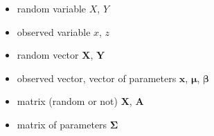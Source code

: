\documentclass[
]{article}
\begin{document}
\newcommand{\malpha}{\mathbf{\alpha}}
\newcommand{\mbeta}{\mathbf{\beta}}
\newcommand{\mgamma}{\mathbf{\gamma}}
\newcommand{\mdelta}{\mathbf{\delta}}
\newcommand{\mepsilon}{\mathbf{\epsilon}}
\newcommand{\mvarepsilon}{\mathbf{\varepsilon}}
\newcommand{\mzeta}{\mathbf{\zeta}}
\newcommand{\meta}{\mathbf{\eta}}
\newcommand{\mtheta}{\mathbf{\theta}}
\newcommand{\miota}{\mathbf{\iota}}
\newcommand{\mkappa}{\mathbf{\kappa}}
\newcommand{\mlambda}{\mathbf{\lambda}}
\newcommand{\mmu}{\mathbf{\mu}}
\newcommand{\mnu}{\mathbf{\nu}}
\newcommand{\mxi}{\mathbf{\xi}}
\newcommand{\mpi}{\mathbf{\pi}}
\newcommand{\mrho}{\mathbf{\rho}}
\newcommand{\msigma}{\mathbf{\sigma}}
\newcommand{\mtau}{\mathbf{\tau}}
\newcommand{\mchi}{\mathbf{\chi}}
\newcommand{\mpsi}{\mathbf{\psi}}
\newcommand{\momega}{\mathbf{\omega}}
\newcommand{\mGamma}{\mathbf{\Gamma}}
\newcommand{\mDelta}{\mathbf{\Delta}}
\newcommand{\mTheta}{\mathbf{\Theta}}
\newcommand{\mLambda}{\mathbf{\Lambda}}
\newcommand{\mXi}{\mathbf{\Xi}}
\newcommand{\mPi}{\mathbf{\Pi}}
\newcommand{\mSigma}{\mathbf{\Sigma}}
\newcommand{\mPsi}{\mathbf{\Psi}}
\newcommand{\mOmega}{\mathbf{\Omega}}

\newcommand{\mA}{\mathbf{A}}
\newcommand{\mB}{\mathbf{B}}
\newcommand{\mC}{\mathbf{C}}
\newcommand{\mD}{\mathbf{D}}
\newcommand{\mE}{\mathbf{E}}
\newcommand{\mF}{\mathbf{F}}
\newcommand{\mG}{\mathbf{G}}
\newcommand{\mH}{\mathbf{H}}
\newcommand{\mI}{\mathbf{I}}
\newcommand{\mJ}{\mathbf{J}}
\newcommand{\mK}{\mathbf{K}}
\newcommand{\mL}{\mathbf{L}}
\newcommand{\mM}{\mathbf{M}}
\newcommand{\mN}{\mathbf{N}}
\newcommand{\mO}{\mathbf{O}}
\newcommand{\mP}{\mathbf{P}}
\newcommand{\mQ}{\mathbf{Q}}
\newcommand{\mR}{\mathbf{R}}
\newcommand{\mS}{\mathbf{S}}
\newcommand{\mT}{\mathbf{T}}
\newcommand{\mU}{\mathbf{U}}
\newcommand{\mV}{\mathbf{V}}
\newcommand{\mW}{\mathbf{W}}
\newcommand{\mX}{\mathbf{X}}
\newcommand{\mY}{\mathbf{Y}}
\newcommand{\mZ}{\mathbf{Z}}

\usepackage{mathbbol}
\newcommand{\ind}[1]{\mathbb{1}[#1]}

\usepackage{amsmath,amsthm,amssymb,amsfonts,mathtools,commath}

\begin{itemize}
\item
  random variable \(X\), \(Y\)
\item
  observed variable \(x\), \(z\)
\item
  random vector \(\boldsymbol{X}\), \(\boldsymbol{Y}\)
\item
  observed vector, vector of parameters \(\boldsymbol{x}\),
  \(\boldsymbol{\mu}\), \(\boldsymbol{\beta}\)
\item
  matrix (random or not) \(\mathbf{X}\), \(\mathbf{A}\)
\item
  matrix of parameters \(\mathbf{\Sigma}\)
\end{itemize}
\end{document}
